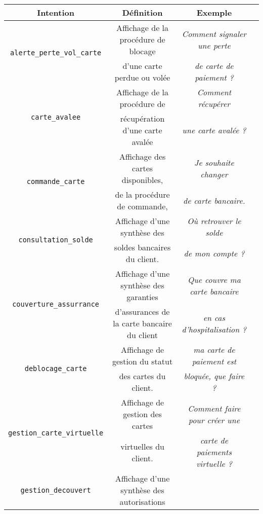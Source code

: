 		\begin{table}[!htb]
			\begin{center}
			\begin{scriptsize}
			\begin{tabular}{|c|c|c|c|}
			
				\hline
				\rowcolor{colorTableHeader!15}
				\textbf{Intention}
					& \textbf{Définition}
					& \textbf{Exemple}
					\tabularnewline
					\hline \hline
				\multirow{2}{*}{\texttt{alerte\_perte\_vol\_carte}}
					& Affichage de la procédure de blocage
					& \textit{Comment signaler une perte}
					\tabularnewline
					& d'une carte perdue ou volée
					& \textit{de carte de paiement ?}
					\tabularnewline
					\hline
				\multirow{2}{*}{\texttt{carte\_avalee}}
					& Affichage de la procédure de
					& \textit{Comment récupérer}
					\tabularnewline
					& récupération d'une carte avalée
					& \textit{une carte avalée ?}
					\tabularnewline
					\hline
				\multirow{2}{*}{\texttt{commande\_carte}}
					& Affichage des cartes disponibles,
					& \textit{Je souhaite changer}
					\tabularnewline
					& de la procédure de commande,
					& \textit{de carte bancaire.}
					\tabularnewline
					\hline
				\multirow{2}{*}{\texttt{consultation\_solde}}
					& Affichage d'une synthèse des
					& \textit{Où retrouver le solde}
					\tabularnewline
					& soldes bancaires du client.
					& \textit{ de mon compte ?}
					\tabularnewline
					\hline
				\multirow{2}{*}{\texttt{couverture\_assurrance}}
					& Affichage d'une synthèse des garanties
					& \textit{Que couvre ma carte bancaire}
					\tabularnewline
					& d'assurances de la carte bancaire du client
					& \textit{en cas d'hospitalisation ?}
					\tabularnewline
					\hline
				\multirow{2}{*}{\texttt{deblocage\_carte}}
					& Affichage de gestion du statut
					& \textit{ma carte de paiement est}
					\tabularnewline
					& des cartes du client.
					& \textit{bloquée, que faire ?}
					\tabularnewline
					\hline
				\multirow{2}{*}{\texttt{gestion\_carte\_virtuelle}}
					& Affichage de gestion des cartes
					& \textit{Comment faire pour créer une}
					\tabularnewline
					& virtuelles du client.
					& \textit{carte de paiements virtuelle ?}
					\tabularnewline
					\hline
				\multirow{2}{*}{\texttt{gestion\_decouvert}}
					& Affichage d'une synthèse des autorisations

\end{tabular}
\end{scriptsize}
\end{center}
\end{table}
